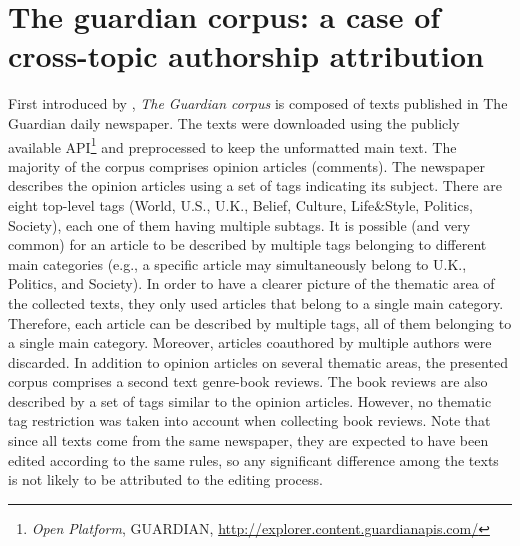 \section{The guardian corpus: a case of cross-topic authorship attribution}

First introduced by \citeauthor{stamatatos2013robustness} \cite{stamatatos2013robustness}, \textit{The Guardian corpus} is composed of texts published in The Guardian daily newspaper. The texts were downloaded using the publicly available API\footnote{\textit{Open Platform}, GUARDIAN, \url{http://explorer.content.guardianapis.com/}} and preprocessed to keep the unformatted main text. The majority of the corpus comprises opinion articles
(comments). The newspaper describes the opinion articles using a set of tags indicating its subject. There are eight top-level tags (World, U.S., U.K., Belief, Culture, Life\&Style, Politics, Society), each one of them having multiple subtags. It is possible (and very common) for an article to be described by multiple tags belonging to different main categories (e.g., a specific article may simultaneously belong to U.K., Politics, and Society). In order to have a clearer picture of the thematic area of the collected texts, they only used articles that belong to a single main category. Therefore, each article can be described by multiple tags, all of them belonging to a single main category. Moreover, articles coauthored by multiple authors were discarded.
In addition to opinion articles on several thematic areas, the presented corpus comprises a second text genre-book reviews. The book reviews are also described by a set of tags similar to the opinion articles. However, no thematic tag restriction was taken into account when collecting book reviews. Note that since all texts come from the same newspaper, they are expected to have been edited according to the same rules, so any significant difference among the texts is not likely to be attributed to the editing process.

